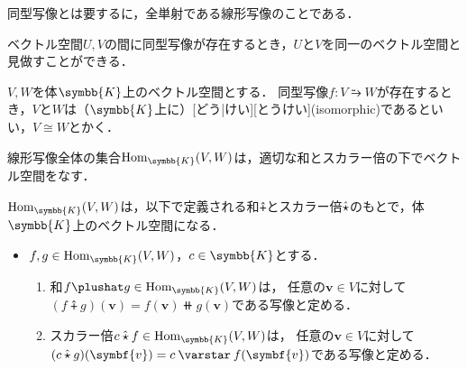 \documentclass[../sotsu.tex]{subfiles}
\begin{document}
同型写像とは要するに，全単射である線形写像のことである．

ベクトル空間$U, V$の間に同型写像が存在するとき，$U$と$V$を同一のベクトル空間と見做すことができる．

\begin{definition}[同型]
    \label{dfn:isomorphic}
    $V, W$を体$\symbb{K}$上のベクトル空間とする．
    同型写像$f \colon V \similarrightarrow W$が存在するとき，$V$と$W$は（$\symbb{K}$上に）[どう|けい][とうけい](isomorphic)であるといい，$V \cong W$とかく．
\end{definition}

線形写像全体の集合$\mathrm{Hom}_{\symbb{K}}(V, W)$は，適切な和とスカラー倍の下でベクトル空間をなす．

\begin{corollary}
    \label{thm:linear-map-space}
    $\mathrm{Hom}_{\symbb{K}}(V, W)$は，以下で定義される和$\plushat$とスカラー倍$\hat{\mathbin{\star}}$のもとで，体$\symbb{K}$上のベクトル空間になる\cite[\S 4.4]{saito-lin-2007}．
    \begin{itemize}
        \item $f, g \in \mathrm{Hom}_{\symbb{K}}(V, W)$，$c \in \symbb{K}$とする．
        \begin{enumerate}
            \item 和$f \plushat g \in \mathrm{Hom}_{\symbb{K}}(V, W)$は，
                任意の$\symbf{v} \in V$に対して$ ( f \plushat g )(\symbf{v}) = f(\symbf{v}) \doubleplus g(\symbf{v}) $である写像と定める．
            \item スカラー倍$c \mathbin{\hat{\scaprod}} f \in \mathrm{Hom}_{\symbb{K}}(V, W)$は，
                任意の$\symbf{v} \in V$に対して$ ( c \mathbin{\hat{\scaprod}} g )(\symbf{v}) = c \scaprodvar f(\symbf{v}) $である写像と定める．
        \end{enumerate}
    \end{itemize}
\end{corollary}
\end{document}
